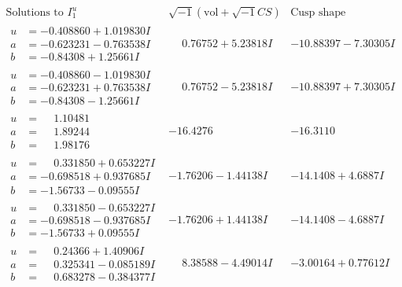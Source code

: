 \documentclass[1p]{elsarticle_modified}
\theoremstyle{definition}
\newcommand{\I}{\sqrt{-1}}
\begin{document}
$$\begin{array}{c|c|c}  
\text{Solutions to }I^u_{1}& \I (\text{vol} + \sqrt{-1}CS) & \text{Cusp shape}\\
 \hline 
\begin{aligned}
u &= -0.408860 + 1.019830 I \\
a &= -0.623231 - 0.763538 I \\
b &= -0.84308 + 1.25661 I\end{aligned}
 & \phantom{-}0.76752 + 5.23818 I & -10.88397 - 7.30305 I \\ \hline\begin{aligned}
u &= -0.408860 - 1.019830 I \\
a &= -0.623231 + 0.763538 I \\
b &= -0.84308 - 1.25661 I\end{aligned}
 & \phantom{-}0.76752 - 5.23818 I & -10.88397 + 7.30305 I \\ \hline\begin{aligned}
u &= \phantom{-}1.10481\phantom{ +0.000000I} \\
a &= \phantom{-}1.89244\phantom{ +0.000000I} \\
b &= \phantom{-}1.98176\phantom{ +0.000000I}\end{aligned}
 & -16.4276\phantom{ +0.000000I} & -16.3110\phantom{ +0.000000I} \\ \hline\begin{aligned}
u &= \phantom{-}0.331850 + 0.653227 I \\
a &= -0.698518 + 0.937685 I \\
b &= -1.56733 - 0.09555 I\end{aligned}
 & -1.76206 - 1.44138 I & -14.1408 + 4.6887 I \\ \hline\begin{aligned}
u &= \phantom{-}0.331850 - 0.653227 I \\
a &= -0.698518 - 0.937685 I \\
b &= -1.56733 + 0.09555 I\end{aligned}
 & -1.76206 + 1.44138 I & -14.1408 - 4.6887 I \\ \hline\begin{aligned}
u &= \phantom{-}0.24366 + 1.40906 I \\
a &= \phantom{-}0.325341 - 0.085189 I \\
b &= \phantom{-}0.683278 - 0.384377 I\end{aligned}
 & \phantom{-}8.38588 - 4.49014 I & -3.00164 + 0.77612 I \\ \hline\begin{aligned}

\end{aligned}
\end{array}$$
\end{document}

